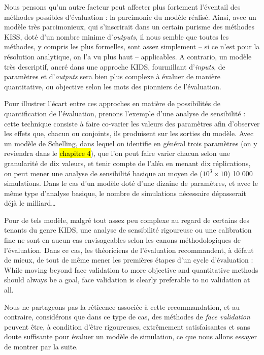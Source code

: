 Nous pensons qu'un autre facteur peut affecter plus fortement l'éventail des méthodes possibles d'évaluation :
	la parcimonie du modèle réalisé.
Ainsi, avec un modèle très parcimonieux, qui s'inscrirait dans un certain purisme des méthodes \og KISS\fg{}, doté d'un nombre minime d'\textit{outputs}, il nous semble que toutes les méthodes, y compris les plus formelles, sont assez simplement -- si ce n'est pour la résolution analytique, on l'a vu plus haut -- applicables.
A contrario, un modèle très descriptif, ancré dans une approche \og KIDS\fg{}, fourmillant d'\textit{inputs}, de paramètres et d'\textit{outputs} sera bien plus complexe à évaluer de manière quantitative, ou \og objective\fg{} selon les mots des pionniers de l'évaluation.

Pour illustrer l'écart entre ces approches en matière de possibilités de quantification de l'évaluation, prenons l'exemple d'une analyse de sensibilité :
	cette technique consiste à faire co-varier les valeurs des paramètres afin d'observer les effets que, chacun ou conjoints, ils produisent sur les sorties du modèle.
Avec un modèle de Schelling, dans lequel on identifie en général trois paramètres (on y reviendra dans le \hl{chapitre 4}), que l'on peut faire varier chacun selon une granularité de dix valeurs, et tenir compte de l'aléa en menant dix réplications, on peut mener une analyse de sensibilité basique au moyen de ($10^3 \times 10$) 10 000 simulations.
Dans le cas d'un modèle doté d'une dizaine de paramètres, et avec le même type d'analyse basique, le nombre de simulations nécessaire dépasserait déjà le milliard\ldots

Pour de tels modèle, malgré tout assez peu complexe au regard de certains des tenants du genre KIDS, une analyse de sensibilité rigoureuse ou une calibration fine ne sont en aucun cas envisageables selon les canons méthodologiques de l'évaluation.
Dans ce cas, les théoriciens de l'évaluation recommandent, à défaut de mieux, de tout de même mener les premières étapes d'un cycle d'évaluation \autocite[342]{petty2010verification} :
	\og While moving beyond face validation to more objective and quantitative methods should always be a goal, face validation is clearly preferable to no validation at all.\fg{}

Nous ne partageons pas la réticence associée à cette recommandation, et au contraire, considérons que dans ce type de cas, des méthodes de \og \textit{face validation}\fg{} peuvent être, à condition d'être rigoureuses, extrêmement satisfaisantes et sans doute suffisante pour évaluer un modèle de simulation, ce que nous allons essayer de montrer par la suite.

